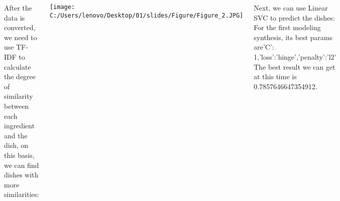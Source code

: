\documentclass{tikzposter} %
\begin{document}
\begin{columns}
{%

\begin{description}
    \item
    After the data is converted, we need to use TF-IDF to calculate the degree of 
    similarity between each ingredient and the dish, on this basis, we can find 
    dishes with more similarities:
\end{description}
\begin{minipage}{1\linewidth}
  \centering
  \texttt{[image: C:/Users/lenovo/Desktop/01/slides/Figure/Figure\_2.JPG]} 
\end{minipage}

\begin{description}
  \item
  Next, we can use Linear SVC to predict the dishes:
  For the first modeling synthesis, its best params are'C': 1,'loss':'hinge','penalty':'l2'\\
  The best result we can get at this time is 0.7857646647354912.

\end{description}

           
}
\end{columns}
\end{document}
